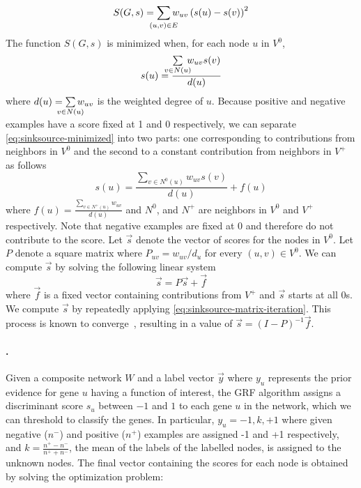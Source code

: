 \begin{equation}
    S(G,s) = \sum_{\mathclap{(u,v)\in{}E}} w_{uv}\left(s(u) - s(v)\right)^2
\end{equation}
The function $S(G,s)$ is minimized when, for each node $u$ in $V^0$, 
\begin{equation}
\label{eq:sinksource-minimized}
    s(u) = \frac{\sum\limits_{\mathclap{v \in N(u)}}\hspace{2.5pt} w_{uv} s(v)}{d(u)}
\end{equation}
where $d(u) = \sum\limits_{\mathclap{v \in N(u)}} w_{uv}$ is the weighted degree of $u$.
Because positive and negative examples have a score fixed at 1 and 0 respectively, we can separate \cref{eq:sinksource-minimized} into two parts: one corresponding to contributions from neighbors in $V^0$ and the second to a constant contribution from neighbors in $V^+$ as follows
\begin{equation}
    s(u) = \frac{\sum\limits_{v \in N^0(u)} w_{uv} s(v)}{d(u)} + f(u)
\end{equation}
where $f(u) = \frac{\sum\limits_{v \in N^+(u)} w_{uv} }{d(u)}$
and $N^0$, and $N^+$ are neighbors in $V^0$ and $V^+$ respectively.
Note that negative examples are fixed at $0$ and therefore do not contribute to the score.
Let $\vec{s}$ denote the vector of scores for the nodes in $V^0$. 
Let $P$ denote a square matrix where $P_{uv} = w_{uv} / d_u$ for every $(u,v) \in V^{0}$.
We can compute $\vec{s}$ by solving the following linear system
\begin{equation}
\label{eq:sinksource-matrix-iteration}
    \vec{s} = P\vec{s} + \vec{f}
\end{equation}
where $\vec{f}$ is a fixed vector containing contributions from $V^+$ and $\vec{s}$ starts at all $0$s.
We compute $\vec{s}$ by repeatedly applying \cref{eq:sinksource-matrix-iteration}. %
This process is known to converge~\cite{zhu-lafferty-semi-supervised-learning-icml-2003}, resulting in a value of $\vec{s} = (I - P)^{-1} \vec{f}$.


\paragraph{\genemania.}
Given a composite network $W$ and a label vector $\vec{y}$ where $y_u$ represents the prior evidence for gene $u$ having a function of interest, the GRF algorithm assigns a discriminant score $s_u$ between $-1$ and $1$ to each gene $u$ in the network, which we can threshold to classify the genes.
In particular, $y_u = {-1,k,+1}$ where given negative ($n^-$) and positive ($n^+$) examples are assigned -1 and +1 respectively, and $k = \frac{n^+ - n^-}{n^+ + n^-}$, the mean of the labels of the labelled nodes, is assigned to the unknown nodes.
The final vector containing the scores for each node is obtained by solving the optimization problem:

